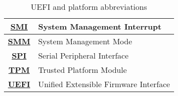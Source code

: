 \begin{table}[h]
{\begin{tabular}{|c|P{13cm}|}
\href{https://en.wikipedia.org/wiki/System_Management_Mode}{\textbf{SMI}} & System Management Interrupt \\   \hline
\href{https://en.wikipedia.org/wiki/System_Management_Mode}{\textbf{SMM}} & System Management Mode \\   \hline
\href{https://en.wikipedia.org/wiki/Serial_Peripheral_Interface}{\textbf{SPI}} & Serial Peripheral Interface \\   \hline
\href{https://en.wikipedia.org/wiki/Trusted_Platform_Module}{\textbf{TPM}} & Trusted Platform Module \\   \hline
\href{https://www.uefi.org/}{\textbf{UEFI}} & Unified Extensible Firmware Interface \\   \hline
\end{tabular}
}
\caption{UEFI and platform abbreviations}
\end{table}
